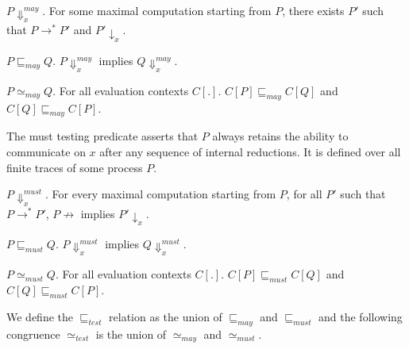\begin{definition}
    $P \Downarrow^{may}_{x}$. For some maximal computation starting from $P$, there exists $P'$ such that $P \rightarrow^* P'$ and $P' \downarrow_{x}$.
    \label{def:maypred}
\end{definition}
\vspace{10pt}
\begin{definition}
    $P \sqsubseteq_{may} Q$. $P \Downarrow^{may}_{x}$ implies $Q \Downarrow^{may}_{x}$.
    \label{def:mayequiv}
\end{definition}
\vspace{10pt}
\begin{definition}
    $P \simeq_{may} Q$. For all evaluation contexts $C[.]$. $C[P] \sqsubseteq_{may} C[Q]$ and $C[Q] \sqsubseteq_{may} C[P]$.
    \label{def:maycong}
\end{definition}
The must testing predicate asserts that $P$ always retains the ability to communicate on $x$ after any sequence of internal reductions. It is defined over all finite traces of some process $P$.
\vspace{10pt}
\begin{definition}
    $P \Downarrow^{must}_{x}$. For every maximal computation starting from $P$, for all $P'$ such that $P \rightarrow^* P'$, $P\not \rightarrow$ implies $P' \downarrow_{x}$.
    \label{def:mustpred}
\end{definition}
\vspace{10pt}
\begin{definition}
    $P \sqsubseteq_{must} Q$. $P \Downarrow^{must}_{x}$ implies $Q \Downarrow^{must}_{x}$.
    \label{def:mustequiv}
\end{definition}
\vspace{10pt}
\begin{definition}
    $P \simeq_{must} Q$. For all evaluation contexts $C[.]$. $C[P] \sqsubseteq_{must} C[Q]$ and $C[Q] \sqsubseteq_{must} C[P]$.
    \label{def:mustcong}
\end{definition}
\vspace{10pt}
We define the $\sqsubseteq_{test}$ relation as the union of $\sqsubseteq_{may}$ and $\sqsubseteq_{must}$ and the following congruence $\simeq_{test}$ is the union of $\simeq_{may}$ and $\simeq_{must}$.


